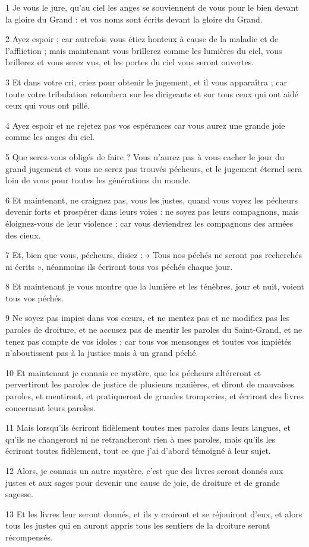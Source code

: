 \par 1 Je vous le jure, qu'au ciel les anges se souviennent de vous pour le bien devant la gloire du Grand : et vos noms sont écrits devant la gloire du Grand.
\par 2 Ayez espoir ; car autrefois vous étiez honteux à cause de la maladie et de l'affliction ; mais maintenant vous brillerez comme les lumières du ciel, vous brillerez et vous serez vus, et les portes du ciel vous seront ouvertes.
\par 3 Et dans votre cri, criez pour obtenir le jugement, et il vous apparaîtra ; car toute votre tribulation retombera sur les dirigeants et sur tous ceux qui ont aidé ceux qui vous ont pillé.
\par 4 Ayez espoir et ne rejetez pas vos espérances car vous aurez une grande joie comme les anges du ciel.
\par 5 Que serez-vous obligés de faire ? Vous n’aurez pas à vous cacher le jour du grand jugement et vous ne serez pas trouvés pécheurs, et le jugement éternel sera loin de vous pour toutes les générations du monde.
\par 6 Et maintenant, ne craignez pas, vous les justes, quand vous voyez les pécheurs devenir forts et prospérer dans leurs voies : ne soyez pas leurs compagnons, mais éloignez-vous de leur violence ; car vous deviendrez les compagnons des armées des cieux.
\par 7 Et, bien que vous, pécheurs, disiez : « Tous nos péchés ne seront pas recherchés ni écrits », néanmoins ils écriront tous vos péchés chaque jour.
\par 8 Et maintenant je vous montre que la lumière et les ténèbres, jour et nuit, voient tous vos péchés.
\par 9 Ne soyez pas impies dans vos cœurs, et ne mentez pas et ne modifiez pas les paroles de droiture, et ne accusez pas de mentir les paroles du Saint-Grand, et ne tenez pas compte de vos idoles ; car tous vos mensonges et toutes vos impiétés n'aboutissent pas à la justice mais à un grand péché.
\par 10 Et maintenant je connais ce mystère, que les pécheurs altéreront et pervertiront les paroles de justice de plusieurs manières, et diront de mauvaises paroles, et mentiront, et pratiqueront de grandes tromperies, et écriront des livres concernant leurs paroles.
\par 11 Mais lorsqu'ils écriront fidèlement toutes mes paroles dans leurs langues, et qu'ils ne changeront ni ne retrancheront rien à mes paroles, mais qu'ils les écriront toutes fidèlement, tout ce que j'ai d'abord témoigné à leur sujet.
\par 12 Alors, je connais un autre mystère, c'est que des livres seront donnés aux justes et aux sages pour devenir une cause de joie, de droiture et de grande sagesse.
\par 13 Et les livres leur seront donnés, et ils y croiront et se réjouiront d'eux, et alors tous les justes qui en auront appris tous les sentiers de la droiture seront récompensés.

